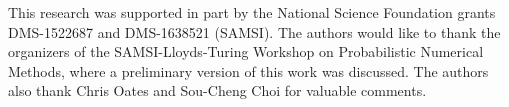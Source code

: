 \documentclass[twocolumn]{svjour3}          %
\begin{document}

\begin{acknowledgements}
This research was supported in part by the National Science Foundation grants DMS-1522687 and DMS-1638521 (SAMSI).
The authors would like to thank the organizers of the SAMSI-Lloyds-Turing Workshop on Probabilistic Numerical Methods, where a preliminary version of this work was discussed.  The authors also thank Chris Oates and Sou-Cheng Choi for valuable comments.
\end{acknowledgements}
\end{document}
